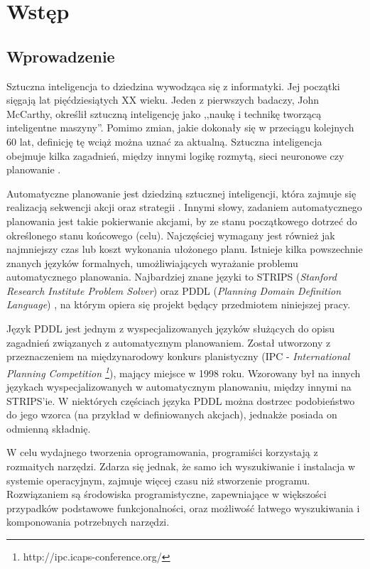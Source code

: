 \chapter{Wstęp}
\label{sec:wstep}
\section{Wprowadzenie}
Sztuczna inteligencja to dziedzina wywodząca się z informatyki. Jej początki sięgają lat pięćdziesiątych XX wieku. Jeden z pierwszych badaczy,  John McCarthy, określił sztuczną inteligencję jako ,,naukę i technikę tworzącą inteligentne maszyny''. Pomimo zmian, jakie dokonały się w przeciągu kolejnych 60 lat, definicję tę wciąż można uznać za aktualną. Sztuczna inteligencja obejmuje kilka zagadnień, między innymi logikę rozmytą, sieci neuronowe czy planowanie \cite{ai}.

Automatyczne planowanie jest dziedziną sztucznej inteligencji, która zajmuje się realizacją sekwencji akcji oraz strategii \cite{planning}. Innymi słowy, zadaniem automatycznego planowania jest takie pokierwanie akcjami, by ze stanu początkowego dotrzeć do określonego stanu końcowego (celu). Najczęściej wymagany jest również jak najmniejszy czas lub koszt wykonania ułożonego planu. Istnieje kilka powszechnie znanych języków formalnych, umożliwiających wyrażanie problemu automatycznego planowania. Najbardziej znane języki to STRIPS (\textit{Stanford Research Institute Problem Solver}) \cite{strips} oraz PDDL (\textit{Planning Domain Definition Language}) \cite{pddl}, na którym opiera się projekt będący przedmiotem niniejszej pracy.
	
Język PDDL jest jednym z wyspecjalizowanych języków służących do opisu zagadnień związanych z automatycznym planowaniem. Został utworzony z przeznaczeniem na międzynarodowy konkurs planistyczny (IPC - \emph{International Planning Competition \footnote{http://ipc.icaps-conference.org/}}), mający miejsce w 1998 roku. Wzorowany był na innych językach wyspecjalizowanych w automatycznym planowaniu, między innymi na STRIPS'ie. W niektórych częściach języka PDDL można dostrzec podobieństwo do jego wzorca (na przykład w definiowanych akcjach), jednakże posiada on odmienną składnię.   

W celu wydajnego tworzenia oprogramowania, programiści korzystają z rozmaitych narzędzi. Zdarza się jednak, że samo ich wyszukiwanie i instalacja w systemie operacyjnym, zajmuje więcej czasu niż stworzenie programu. Rozwiązaniem są środowiska programistyczne, zapewniające w większości przypadków podstawowe funkcjonalności, oraz możliwość łatwego wyszukiwania i komponowania potrzebnych narzędzi.

